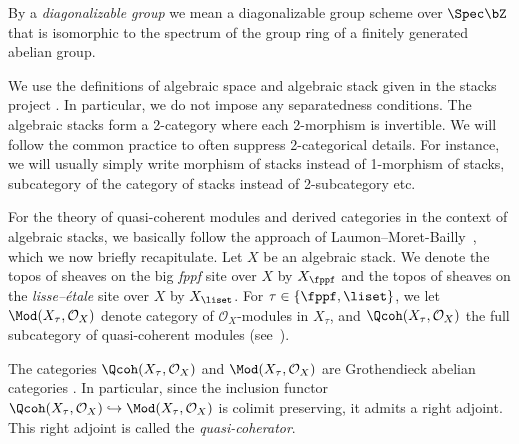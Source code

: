 By a \emph{diagonalizable group} we mean a diagonalizable group scheme
over $\Spec \bZ$ that is isomorphic to the spectrum of the group
ring of a finitely generated abelian group.

We use the definitions of algebraic space and algebraic stack given in the stacks project
\cite[, ]{stacks-project}.
In particular, we do not impose any separatedness conditions. 
The algebraic stacks form a 2-category where each 2-morphism is invertible.
We will follow the common practice to often suppress 2-categorical details.
For instance, we will usually simply write morphism of stacks instead of 1-morphism
of stacks, subcategory of the category of stacks instead of 2-subcategory etc.

For the theory of quasi-coherent modules and derived categories in the context of algebraic stacks,
we basically follow the approach of Laumon--Moret-Bailly~\cite[Sections~12 and~13]{lmb2000},
which we now briefly recapitulate.
Let $X$ be an algebraic stack.
We denote the topos of sheaves on the big \emph{fppf} site over $X$ by $X_\fppf$
and the topos of sheaves on the \emph{lisse--étale} site over $X$ by $X_\liset$.
For $\tau \in \{\fppf, \liset\}$,
we let $\Mod(X_\tau, \mathcal{O}_X)$ denote category of $\mathcal{O}_X$-modules in $X_\tau$,
and $\Qcoh(X_\tau, \mathcal{O}_X)$ the full subcategory of quasi-coherent modules
(see~\cite[]{stacks-project}).
\begin{remark}
\label{rem-coherator}
The categories $\Qcoh(X_\tau, \mathcal{O}_X)$ and $\Mod(X_\tau, \mathcal{O}_X)$ are Grothendieck abelian categories
\cite[]{stacks-project}.
In particular,
since the inclusion functor $\Qcoh(X_\tau, \mathcal{O}_X) \hookrightarrow \Mod(X_\tau, \mathcal{O}_X)$ is colimit preserving,
it admits a right adjoint.
This right adjoint is called the \emph{quasi-coherator}.
\end{remark}

